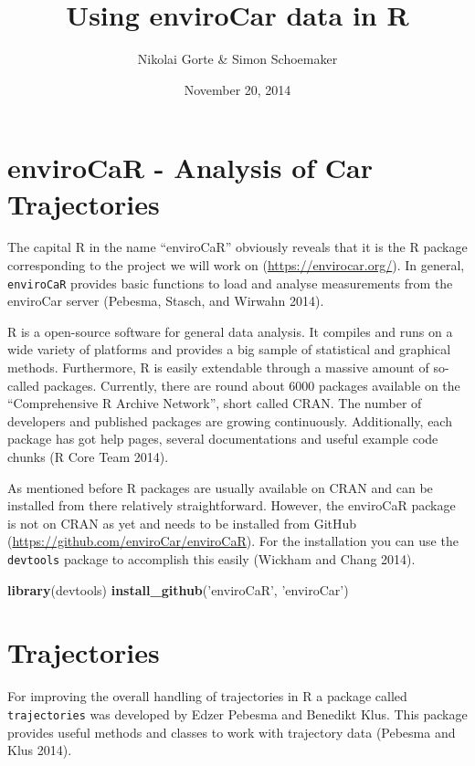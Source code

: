 \documentclass[]{article}
\title{Using enviroCar data in R}
\author{Nikolai Gorte \& Simon Schoemaker}
\date{November 20, 2014}
\newenvironment{Shaded}{\begin{snugshade}}{\end{snugshade}}
\newcommand{\KeywordTok}[1]{\textcolor[rgb]{0.13,0.29,0.53}{\textbf{{#1}}}}
\newcommand{\StringTok}[1]{\textcolor[rgb]{0.31,0.60,0.02}{{#1}}}
\newcommand{\NormalTok}[1]{{#1}}
\begin{document}
\maketitle


\section{enviroCaR - Analysis of Car
Trajectories}\label{envirocar---analysis-of-car-trajectories}

The capital R in the name ``enviroCaR'' obviously reveals that it is the
R package corresponding to the project we will work on
(\url{https://envirocar.org/}). In general, \texttt{enviroCaR} provides
basic functions to load and analyse measurements from the enviroCar
server (Pebesma, Stasch, and Wirwahn 2014).

R is a open-source software for general data analysis. It compiles and
runs on a wide variety of platforms and provides a big sample of
statistical and graphical methods. Furthermore, R is easily extendable
through a massive amount of so-called packages. Currently, there are
round about 6000 packages available on the ``Comprehensive R Archive
Network'', short called CRAN. The number of developers and published
packages are growing continuously. Additionally, each package has got
help pages, several documentations and useful example code chunks (R
Core Team 2014).

As mentioned before R packages are usually available on CRAN and can be
installed from there relatively straightforward. However, the enviroCaR
package is not on CRAN as yet and needs to be installed from GitHub
(\url{https://github.com/enviroCar/enviroCaR}). For the installation you
can use the \texttt{devtools} package to accomplish this easily (Wickham
and Chang 2014).

\begin{Shaded}
\begin{Highlighting}[]
\KeywordTok{library}\NormalTok{(devtools)}
\KeywordTok{install_github}\NormalTok{(}\StringTok{'enviroCaR'}\NormalTok{, }\StringTok{'enviroCar'}\NormalTok{)}
\end{Highlighting}
\end{Shaded}

\section{Trajectories}\label{trajectories}

For improving the overall handling of trajectories in R a package called
\texttt{trajectories} was developed by Edzer Pebesma and Benedikt Klus.
This package provides useful methods and classes to work with trajectory
data (Pebesma and Klus 2014).
\end{document}
